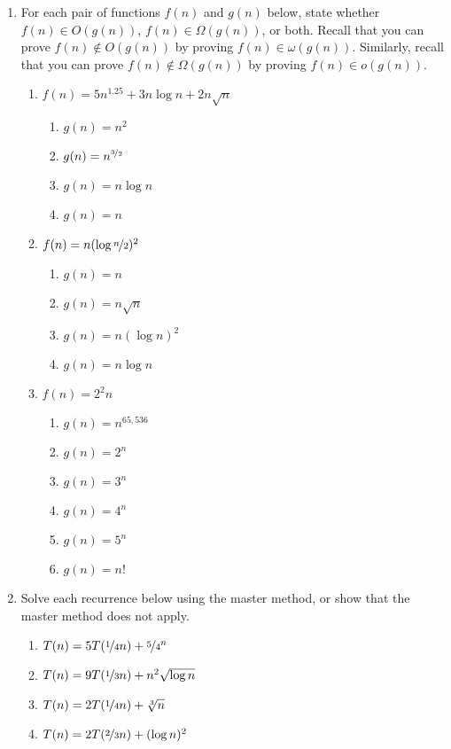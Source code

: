 \documentclass{article}
\begin{document}
\begin{enumerate}
  \pagebreak[2]
\item
  For each pair of functions \(f(n)\) and \(g(n)\) below, state whether
  \mbox{\(f(n) \in O(g(n))\)}, \mbox{\(f(n) \in \Omega(g(n))\)}, or both.
  Recall that you can prove \mbox{\(f(n) \not\in O(g(n))\)} by proving
  \mbox{\(f(n) \in \omega(g(n))\)}.  Similarly, recall that you can prove
  \mbox{\(f(n) \not\in \Omega(g(n))\)} by proving
  \mbox{\(f(n) \in o(g(n))\)}.
  \begin{enumerate}
  \item \(f(n) = 5n^{1.25} + 3n\log n + 2 n\sqrt{n}\)
    \begin{enumerate}
    \item \(g(n) = n^2\)
    \item \(g(n) = n^{\nicefrac{3}{2}}\)
    \item \(g(n) = n\log n\)
    \item \(g(n) = n\)
    \end{enumerate}
  \item \(f(n) = n (\log \nicefrac{n}{2})^2\)
    \begin{enumerate}
    \item \(g(n) = n\)
    \item \(g(n) = n \sqrt{n}\)
    \item \(g(n) = n (\log n)^2\)
    \item \(g(n) = n \log n\)
    \end{enumerate}
  \item \(f(n) = 2^2n\)
    \begin{enumerate}
      \item \(g(n) = n^{65,536}\)
      \item \(g(n) = 2^n\)
      \item \(g(n) = 3^n\)
      \item \(g(n) = 4^n\)
      \item \(g(n) = 5^n\)
      \item \(g(n) = n!\)
    \end{enumerate}
  \end{enumerate}

  \pagebreak[2]
\item
  Solve each recurrence below using the master method, or show that the
  master method does not apply.
  \begin{enumerate}
  \item \(T(n) = 5T(\nicefrac{1}{4}n) + \nicefrac{5}{4}^n\)
  \item \(T(n) = 9T(\nicefrac{1}{3}n) + n^2\sqrt{\log n}\)
  \item \(T(n) = 2T(\nicefrac{1}{4}n) + \sqrt[3]{n}\)
  \item \(T(n) = 2T(\nicefrac{2}{3}n) + (\log n)^2\)
  \end{enumerate}

\end{enumerate}
\end{document}
